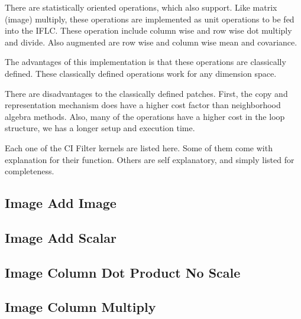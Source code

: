 \documentclass[11pt]{article}
\begin{document}
	
There are statistically oriented operations, which also support.  Like matrix (image) multiply, these operations are implemented as unit operations to be fed into the IFLC.  These operation include column wise and row wise dot multiply and divide.   Also augmented are row wise and column wise mean and covariance.  

	
The advantages of this implementation is that these operations are classically defined.  These classically defined operations work for any dimension space.  

There are disadvantages to the classically defined patches.  First, the copy and representation mechanism does have a higher cost factor than neighborhood algebra methods.  Also, many of the operations have a higher cost in the loop structure, we has a longer setup and execution time.   

Each one of the CI Filter kernels are listed here.  Some of them come with explanation for their  function.  Others are self explanatory, and simply listed for completeness.
	
	

\subsection{Image Add Image}

\subsection{Image Add Scalar}

\subsection{Image Column Dot Product No Scale}

\subsection{Image Column Multiply}
\end{document}
